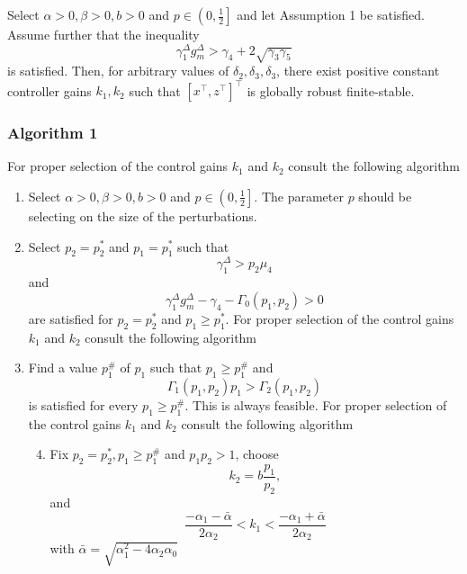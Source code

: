 \begin{theorem}
Select $\alpha > 0, \beta > 0, b > 0$ and $p \in \left(0, \frac{1}{2}\right]$ and let Assumption 1 be satisfied. Assume further that the inequality 
\begin{equation}
    \gamma_1^\Delta g_m^\Delta > \gamma_4 + 2\sqrt{\gamma_3 \gamma_5}
\end{equation} 
is satisfied. Then, for arbitrary values of $\delta_2, \delta_3, \delta_3$, there exist positive constant controller gains $k_1, k_2$ such that $\left[x^\top, z^\top\right]^\top$ is globally robust finite-stable.
\end{theorem}

\subsubsection{Algorithm 1}
For proper selection of the control gains $k_1$ and $k_2$ consult the following algorithm
\begin{enumerate}
    \item Select $\alpha > 0, \beta > 0, b > 0$ and $p \in \left(0, \frac{1}{2}\right]$. The parameter $p$ should be selecting on the size of the perturbations.
    \item Select $p_2 = p_2^*$ and $p_1 = p_1^*$ such that 
    \begin{equation}
        \gamma_1^\Delta > p_2\mu_4
    \end{equation}
    and 
    \begin{equation}
        \gamma_1^\Delta g_m^\Delta - \gamma_4 - \Gamma_0 (p_1, p_2) > 0
    \end{equation}
    are satisfied for $p_2 = p_2^*$ and $p_1 \geq p_1^*$.  For proper selection of the control gains $k_1$ and $k_2$ consult the following algorithm
    \item Find a value $p^\#_1$ of $p_1$ such that $p_1 \geq p^\#_1$ and
    \begin{equation}
        \Gamma_1(p_1, p_2)p_1 > \Gamma_2(p_1, p_2)
    \end{equation}
    is satisfied for every $p_1 \geq p^\#_1$. This is always feasible.
    For proper selection of the control gains $k_1$ and $k_2$ consult the following algorithm
        \begin{enumerate}
            \setcounter{enumi}{3}
            \item Fix $p_2 = p_2^*, p_1\geq p_1^\#$ and $p_1 p_2 > 1$, choose
            \begin{equation}
                k_2 = b\frac{p_1}{p_2},
            \end{equation}
            and 
            \begin{equation}
                \frac{-\alpha_1 - \bar{\alpha}}{2\alpha_2} < k_1 < \frac{-\alpha_1 + \bar{\alpha}}{2\alpha_2}
            \end{equation}
            with $\bar{\alpha} = \sqrt{\alpha^2_1 - 4\alpha_2 \alpha_0}$
        \end{enumerate}
\end{enumerate}



